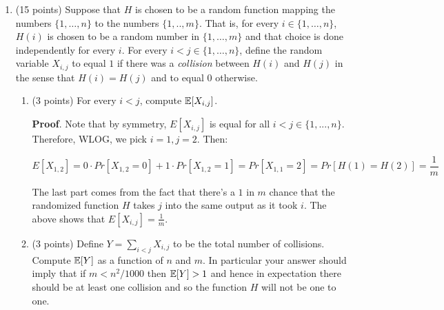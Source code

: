 \documentclass{article}
\begin{document}
\begin{enumerate}
\item{}
(15 points) Suppose that $H$ is chosen to be a random function mapping the numbers
$\{1,\ldots,n\}$ to the numbers $\{1,..,m \}$. That is, for every $i\in\{1,\ldots,n\}$, $H(i)$ is chosen to be a random number in $\{ 1,\ldots, m \}$ and that choice is done 
independently for every $i$. For every $i < j \in \{1,\ldots,n\}$, define the random variable $X_{i,j}$ to equal $1$ if there
was a \emph{collision} between $H(i)$ and $H(j)$ in the sense that
$H(i)=H(j)$ and to equal $0$ otherwise.%

\begin{enumerate}[,label=\alph*.]%

\item{}
(3 points) For every $i < j$, compute $\mathbb{E}[ X_{i,j} ]$.%

\begin{mdbmarginx}{1ex}{0pt}{1ex}{0pt}%
\noindent{}\textbf{Proof}.  Note that by symmetry, $E[X_{i,j}]$ is equal for all $i < j \in \{1,...,n\}$. Therefore, WLOG, 
we pick $i=1,j=2$. Then:%
\end{mdbmarginx}%
\noindent\noindent\[%
E[X_{1,2}] = 0 \cdot Pr[X_{1,2} = 0] + 1 \cdot Pr[X_{1,2} = 1] = Pr[X_{1,1} = 2] = 
Pr[H(1) = H(2)] = \frac{1}{m}
\]%

The last part comes from the fact that there's a $1$ in $m$ chance that the randomized function $H$ takes $j$ into the same output as it took $i$. The above shows that $E[X_{i,j}] = \frac{1}{m}$.
\mdfloatright{\ensuremath{\Box}}%

\item{}
(3 points) Define $Y = \sum_{i < j} X_{i,j}$ to be the total number of collisions. Compute $\mathbb{E}[ Y ]$ as a function of $n$ and $m$.
In particular your answer should imply that if $m < n^2/1000$ then $\mathbb{E}[Y]>1$ and hence in expectation
there should be at least one collision and so the function $H$ will not be one to one.%


\end{enumerate}
\end{enumerate}
\end{document}
